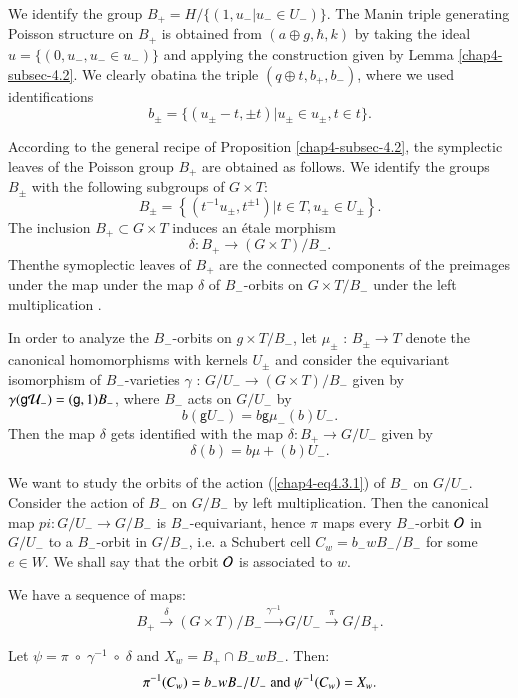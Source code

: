 We identify the group $B_{+}= H/\{(1,u_{-} | u_{-}\in U_{-})\}$. The Manin triple generating Poisson structure on $B_{+}$ is obtained from $(a \oplus g, \hbar, k)$ by taking the ideal $u=\{(0, u_{-}, u_{-} \in u_{-})\}$ and applying the construction given by Lemma \ref{chap4-subsec-4.2}. We clearly obatina the triple $(q \oplus t, b_{+}, b_{-})$, where we used identifications
$$
b_{\pm} = \{(u_{\pm}-t, \pm t) | u_{\pm} \in u_{\pm}, t \in t\}.
$$

According to the general recipe of Proposition \ref{chap4-subsec-4.2}, the symplectic leaves of the Poisson group $B_{+}$ are obtained as follows. We identify the groups $B_{\pm}$ with the following subgroups of $G\times T$:
$$
B_{\pm} =\left\{(t^{-1}u_{\pm}, t^{\pm 1}) | t \in T, u_{\pm} \in U_{\pm}\right\}.
$$
The inclusion $B_{+} \subset G\times T$ induces an \'etale morphism
$$
\delta: B_{+}\rightarrow (G\times T)/B_{-}.
$$
Then\pageoriginale the symoplectic leaves of $B_{+}$ are the connected components of the preimages under the map under the map $\delta$ of $B_{-}$-orbits on $G\times T/B_{-}$ under the left multiplication .

In order to analyze the $B_{-}$-orbits on $g\times T/B_{-}$, let $\mu_{\pm}$ : $B_{\pm} \rightarrow T$ denote the canonical homomorphisms with kernels $U_{\pm}$ and consider the equivariant isomorphism of $B_{-}$-varieties $\gamma$ : $G/U_{-}\rightarrow (G\times T)/B_{-}$ given by $\gamma(\mathsf{g}\mathcal{U}_{-})= (\mathsf{g}, 1)B_{-}$, where $B_{-}$ acts on $G/U_{-}$ by  
\begin{equation*}
b(\mathsf{g}U_{-}) = b\mathsf{g}\mu_{-}(b)U_{-}.\tag{4.3.1}\label{chap4-eq4.3.1}
\end{equation*}
Then the map $\delta$ gets identified with the map $\delta : B_{+} \rightarrow G/U_{-}$ given by
$$
\delta(b)= b\mu{+}(b)U_{-}.
$$ 

We want to study the orbits of the action (\ref{chap4-eq4.3.1}) of $B_{-}$ on $G/U_{-}$. Consider the action of $B_{-}$ on $G/B_{-}$ by left multiplication. Then the canonical map $pi: G/U_{-} \rightarrow G/B_{-}$ is $B_{-}$-equivariant, hence $\pi$ maps every $B_{-}$-orbit $\mathcal{O}$ in $G/U_{-}$ to a $B_{-}$-orbit in $G/B_{-}$, i.e. a Schubert cell $C_{w}= b_{-}wB_{-}/B_{-}$ for some $e \in W$. We shall say that the orbit $\mathcal{O}$ is associated to $w$.   

\begin{remark*}
We have a sequence of maps:
$$
B_{+} \xrightarrow{\delta}(G\times T)/B_{-} \xrightarrow{\gamma^{-1}}G/U_{-}\xrightarrow{\pi} G/B_{+}.
$$

Let $\psi = \pi \;\circ \; \gamma^{-1}\; \circ \; \delta$ and $X_{w} = B_{+} \cap B_{-}w B_{-}$. Then:
$$
\pi^{-1}(C_{w})= b_{-}wB_{-}/U_{-} \;\text{\rm and}\; \psi^{-1}(C_{w})= X_{w}.
$$
\end{remark*}

